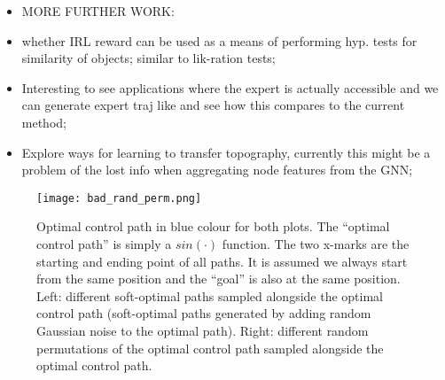\documentclass{report}
\numberwithin{equation}{section}
\numberwithin{figure}{section}
\numberwithin{table}{section}
\numberwithin{algorithm}{section}
\begin{document}
\begin{itemize}
  \item MORE FURTHER WORK:
  \item whether IRL reward can be used as a means of performing 
  hyp. tests for similarity of objects; similar to 
  lik-ration tests;
  \item Interesting to see applications where the 
  expert is actually accessible and we can generate expert traj like \citep{FinnGCL} 
  and see how this compares to the current method;
  \item Explore ways for learning to transfer topography, currently this might be a problem of the lost info when aggregating node features from the GNN;
\end{itemize}

\begin{figure}[H]
  \centering
  \texttt{[image: bad\_rand\_perm.png]}
  \caption{\label{fig:bad_rand_perm} Optimal control path 
  in blue colour for both plots. The ``optimal control path'' 
  is simply a $sin(\cdot)$ function. The two x-marks are the 
  starting and ending point of all paths. It is assumed 
  we always start from the same position and the ``goal'' is also 
  at the same position. Left: different soft-optimal 
  paths sampled alongside the optimal control path (soft-optimal 
  paths generated by adding random Gaussian noise to the optimal 
  path). Right: different 
  random permutations of the optimal control path sampled alongside 
  the optimal control path.}
\end{figure}



\end{document}
